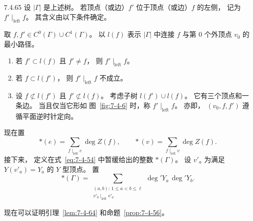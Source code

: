 \begin{definition}{7.4.65}\label{def:7-4-65}
设 $|\Gamma|$ 是上述树。
若顶点（或边）$f'$
位于顶点（或边）$f$ 的左侧，
记为
$f'\mid_{\mathrm{left}}f$。
其含义由以下条件确定。

取
$f,f'\in C^0(\Gamma)\cup C^1(\Gamma)$。
以 $l(f)$ 表示 $|\Gamma|$
中连接 $f$ 与第 $0$ 个外顶点
$v_0$ 的最小路径。
\begin{enumerate}
\item[\textup{(7.4.66.1)}]\label{cond:7-4-66-1}
若 $f'\subset l(f)$
且 $f'\ne f$，
则 $f'\mid_{\mathrm{left}}f$。

\item[\textup{(7.4.66.2)}]\label{cond:7-4-66-2}
若 $f\subset l(f')$，
则 $f'\mid_{\mathrm{left}}f$
不成立。

\item[\textup{(7.4.66.3)}]\label{cond:7-4-66-3}
设 $f\not\subset l(f')$
且 $f'\not\subset l(f)$。
考虑子树
$l(f')\cup l(f)$。
它有三个顶点和一条边。
当且仅当它形如
图~\ref{fig:7-4-6}
时，称
$f'\mid_{\mathrm{left}}f$。
亦即，
$(v_0,f,f')$
遵循平面逆时针定向。
\end{enumerate}
\end{definition}

现在置
\begin{equation}
*(e)
=\sum_{f\mid_{\mathrm{left}}e}
\deg Z(f),
\qquad
*(v)
=\sum_{f\mid_{\mathrm{left}}v}
\deg Z(f).
\tag{7.4.67}\label{eq:7-4-67}
\end{equation}
接下来，
定义在式~\eqref{eq:7-4-54}
中暂缓给出的整数
$*(\Gamma)$。
设 $v'_a$ 为满足
$Y(v'_a)=Y_a$ 的 $Y$ 型顶点。
置
\begin{equation}
*(\Gamma)
=\sum_{\substack{
(a,b):\,1\le a<b\le\ell\\
v'_b\mid_{\mathrm{left}}v'_a
}}
\deg'Y_a\,\deg'Y_b.
\tag{7.4.68}\label{eq:7-4-68}
\end{equation}


现在可以证明引理~\ref{lem:7-4-64}
和命题~\ref{prop:7-4-56}。

